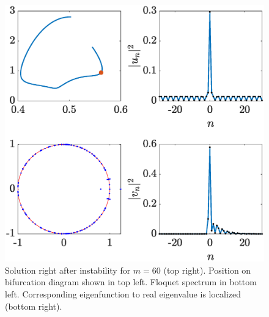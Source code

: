 \documentclass{article}
\begin{document}
\begin{figure}[H]
    \centering
    \includegraphics[width=12cm]{leftafterinstability}
    \caption{Solution right after instability for $m=60$ (top right). Position on bifurcation diagram shown in top left. Floquet spectrum in bottom left. Corresponding eigenfunction to real eigenvalue is localized (bottom right).}
    \label{fig:left3}
\end{figure}







\end{document}
